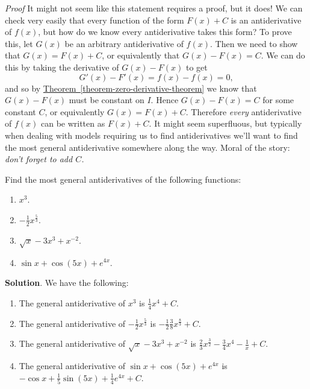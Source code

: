 \documentclass[10pt,]{book}
\makeatletter
\theoremstyle{ptxplainnotitle}
\theoremstyle{ptxplaintitle}
\theoremstyle{ptxplainnotitle}
\theoremstyle{ptxplaintitle}
\theoremstyle{ptxplainnotitle}
\theoremstyle{ptxplaintitle}
\renewcommand*{\proofname}{Proof}
\renewenvironment{proof}[1][\proofname]{\par
  \pushQED{\qed}%
  \normalfont \topsep6\p@\@plus6\p@\relax
  \trivlist
  \item\relax
    {\itshape
    #1\@addpunct{.}}\hspace\labelsep\ignorespaces
}{%
  \popQED\endtrivlist\@endpefalse
}
\theoremstyle{ptxdefinitionnotitle}
\theoremstyle{ptxdefinitiontitle}
\theoremstyle{ptxdefinitionnotitle}
\theoremstyle{ptxdefinitiontitle}
\theoremstyle{ptxdefinitionnotitle}
\theoremstyle{ptxdefinitiontitle}
\theoremstyle{ptxdefinitionnotitle}
\theoremstyle{ptxdefinitiontitle}
\theoremstyle{ptxdefinitionnotitle}
\theoremstyle{ptxdefinitiontitle}
\numberwithin{equation}{section}
\makeatother
\begin{document}
\begin{proof}\hypertarget{proof-9}{}
\hypertarget{p-383}{}%
It might not seem like this statement requires a proof, but it does! We can check very easily that every function of the form \(F(x)+C\) is an antiderivative of \(f(x)\), but how do we know every antiderivative takes this form? To prove this, let \(G(x)\) be an arbitrary antiderivative of \(f(x)\). Then we need to show that \(G(x) = F(x) + C\), or equivalently that \(G(x) - F(x) = C\). We can do this by taking the derivative of \(G(x) - F(x)\) to get%
\begin{equation*}
G'(x) - F'(x) = f(x) - f(x) = 0,
\end{equation*}
and so by \hyperref[theorem-zero-derivative-theorem]{Theorem~\ref{theorem-zero-derivative-theorem}} we know that \(G(x) - F(x)\) must be constant on \(I\). Hence \(G(x) - F(x) = C\) for some constant \(C\), or equivalently \(G(x) = F(x)+C\). Therefore \emph{every} antiderivative of \(f(x)\) can be written as \(F(x) + C\).%
\end{proof}
\hypertarget{p-384}{}%
It might seem superfluous, but typically when dealing with models requiring us to find antiderivatives we'll want to find the most general antiderivative somewhere along the way. Moral of the story: \emph{don't forget to add \(C\).}%
\begin{example}\label{example-finding-antiderivatives}
\hypertarget{p-385}{}%
Find the most general antiderivatives of the following functions: \leavevmode%
\begin{enumerate}
\item\hypertarget{li-28}{}\(x^{3}.\)%
\item\hypertarget{li-29}{}\(-\frac{1}{2}x^{\frac{5}{3}}.\)%
\item\hypertarget{li-30}{}\(\sqrt{x} - 3x^{3} + x^{-2}.\)%
\item\hypertarget{li-31}{}\(\sin x + \cos (5x) + e^{4x}.\)%
\end{enumerate}
%
\par\smallskip%
\noindent\textbf{Solution}.\hypertarget{solution-85}{}\quad%
\hypertarget{p-386}{}%
We have the following: \leavevmode%
\begin{enumerate}
\item\hypertarget{li-32}{}The general antiderivative of \(x^{3}\) is \(\frac{1}{4}x^{4}+C.\)%
\item\hypertarget{li-33}{}The general antiderivative of \(-\frac{1}{2}x^{\frac{5}{3}}\) is \(-\frac{1}{2}\frac{3}{8}x^{\frac{8}{3}}+C.\)%
\item\hypertarget{li-34}{}The general antiderivative of \(\sqrt{x} - 3x^{3} + x^{-2}\) is \(\frac{2}{3}x^{\frac{3}{2}} - \frac{3}{4}x^{4} - \frac{1}{x} + C\).%
\item\hypertarget{li-35}{}The general antiderivative of \(\sin x + \cos (5x) + e^{4x}\) is \(-\cos x + \frac{1}{5}\sin(5x) + \frac{1}{4}e^{4x} + C.\)%
\end{enumerate}
%
\end{example}
\end{document}
